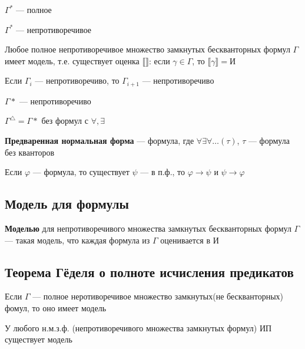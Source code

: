\documentclass[english]{article}
\begin{document}
\begin{property}
	\(\Gamma^*\) --- полное
	\label{org13d2bf2}
\end{property}
\begin{property}
	\(\Gamma^*\) --- непротиворечивое
	\label{orgcee8aa7}
\end{property}
\begin{theorem}
	Любое полное непротиворечивое множество замкнутых бескванторных формул \(\Gamma\) имеет модель, т.е. существует оценка \(\llbracket \rrbracket\): если \(\gamma \in \Gamma\), то \(\llbracket \gamma \rrbracket = \text{И}\)
	\label{orgc8c73cd}
\end{theorem}
\begin{theorem}
	Если \(\Gamma_i\) --- непротиворечиво, то \(\Gamma_{i + 1}\) --- непротиворечиво
	\label{org06d9e06}
\end{theorem}
\begin{theorem}
	\(\Gamma*\) --- непротиворечиво
	\label{org8f2be5a}
\end{theorem}
\begin{corollary}
	\(\Gamma^\triangle = \Gamma*\) без формул с \(\forall, \exists\)
	\label{org5c9d3d4}
\end{corollary}
\begin{definition}
	\textbf{Предваренная нормальная форма} --- формула, где \(\forall \exists \forall \dots(\tau)\), \(\tau\) --- формула без кванторов
	\label{org1a513b0}
\end{definition}
\begin{theorem}
	Если \(\varphi\) --- формула, то существует \(\psi\) --- в п.ф., то \(\varphi \to \psi\) и \(\psi \to \varphi\)
	\label{orgc5bb91c}
\end{theorem}
\subsection{Модель для формулы}
\label{sec:orgfdfb903}
\begin{definition}
	\textbf{Моделью} для непротиворечивого множества замкнутых бескванторных формул \(\Gamma\) --- такая модель, что каждая формула из \(\Gamma\) оценивается в И
	\label{org908ff33}
\end{definition}
\subsection{Теорема Гёделя о полноте исчисления предикатов}
\label{sec:org71a8fb7}
\begin{theorem}
	Если \(\Gamma\) --- полное неротиворечивое множество замкнутых(не бескванторных) фомул, то оно имеет модель
	\label{org72277cf}
\end{theorem}
\begin{theorem}
	У любого н.м.з.ф. (непротиворечивого множества замкнутых формул) ИП существует модель
	\label{orgb96a5fa}
\end{theorem}
\end{document}

